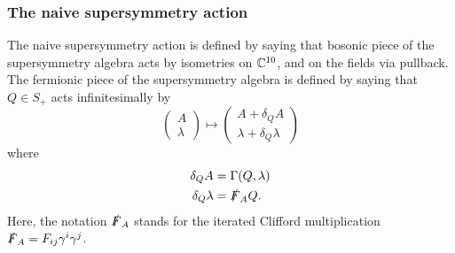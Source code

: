\documentclass[10pt, oneside]{article}
\begin{document}
\subsubsection{The naive supersymmetry action}

The naive supersymmetry action is defined by saying that bosonic piece of the supersymmetry algebra acts by isometries on $\mathbb C^{10}$, and on the fields via pullback. 
The fermionic piece of the supersymmetry algebra is defined by saying that $Q \in S_+$ acts infinitesimally by
\[
\begin{pmatrix}
A \\ \lambda
\end{pmatrix}
\mapsto
\begin{pmatrix} A + \delta_Q A \\
\lambda + \delta_Q \lambda
\end{pmatrix}
\]
where 
\begin{align*}
\delta_Q A &= \Gamma(Q,\lambda) \\
\delta_Q \lambda &= \slashed{F}_A Q .
\end{align*}
Here, the notation $\slashed{F}_A$ stands for the iterated Clifford multiplication $\slashed{F}_A = F_{ij} \gamma^i \gamma^j$.  
\end{document}
